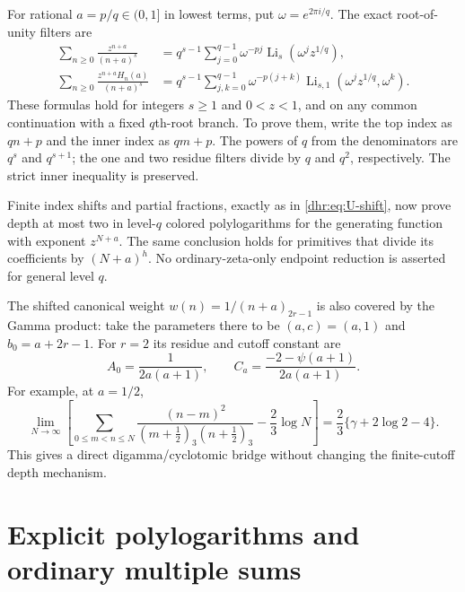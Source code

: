 \documentclass[11pt,letterpaper]{article}
\numberwithin{equation}{section}
\theoremstyle{definition}\newtheorem{definition}[theorem]{Definition}
\theoremstyle{remark}\newtheorem{remark}[theorem]{Remark}
\DeclareMathOperator{\Li}{Li}
\begin{document}
For rational $a=p/q\in(0,1]$ in lowest terms, put
$\omega=e^{2\pi i/q}$. The exact root-of-unity filters are
\begin{align}
 \sum_{n\geq0}\frac{z^{n+a}}{(n+a)^s}
 &=q^{s-1}\sum_{j=0}^{q-1}\omega^{-pj}
                       \Li_s(\omega^jz^{1/q}),
 \label{dhr:eq:single-filter}\\
 \sum_{n\geq0}\frac{z^{n+a}H_n(a)}{(n+a)^s}
 &=q^{s-1}\sum_{j,k=0}^{q-1}\omega^{-p(j+k)}
             \Li_{s,1}(\omega^jz^{1/q},\omega^k).
 \label{dhr:eq:double-filter}
\end{align}
These formulas hold for integers $s\geq1$ and $0<z<1$, and on any
common continuation with a fixed $q$th-root branch. To prove them,
write the top index as $qn+p$ and the inner index as $qm+p$.
The powers of $q$ from the denominators are $q^s$ and $q^{s+1}$;
the one and two residue filters divide by $q$ and $q^2$,
respectively. The strict inner inequality is preserved.

Finite index shifts and partial fractions, exactly as in
\eqref{dhr:eq:U-shift}, now prove depth at most two in level-$q$
colored polylogarithms for the generating function with exponent
$z^{N+a}$. The same conclusion holds for primitives that divide
its coefficients by $(N+a)^h$. No ordinary-zeta-only endpoint
reduction is asserted for general level $q$.

The shifted canonical weight $w(n)=1/(n+a)_{2r-1}$ is also covered
by the Gamma product: take the parameters there to be $(a,c)=(a,1)$
and $b_0=a+2r-1$. For $r=2$ its residue and cutoff constant are
\begin{equation}\label{dhr:eq:translated-cutoff-constant}
 A_0=\frac1{2a(a+1)},\qquad
 C_a=\frac{-2-\psi(a+1)}{2a(a+1)}.
\end{equation}
For example, at $a=1/2$,
\begin{equation}\label{dhr:eq:half-cutoff}
 \lim_{N\to\infty}\left[
 \sum_{0\leq m<n\leq N}
 \frac{(n-m)^2}{(m+\tfrac12)_3(n+\tfrac12)_3}
       -\frac23\log N\right]
 =\frac23\{\gamma+2\log2-4\}.
\end{equation}
This gives a direct digamma/cyclotomic bridge without changing the
finite-cutoff depth mechanism.


\section{Explicit polylogarithms and ordinary multiple sums}
\label{dhr:sec:explicit}
\end{document}
